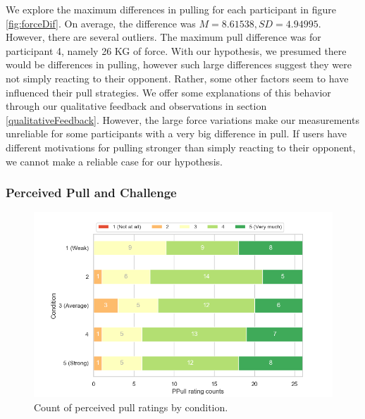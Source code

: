 We explore the maximum differences in pulling for each participant in figure \ref{fig:forceDif}. On average, the difference was $M=8.61538, SD=4.94995$. However, there are several outliers. The maximum pull difference was for participant 4, namely 26 KG of force. With our hypothesis, we presumed there would be differences in pulling, however such large differences suggest they were not simply reacting to their opponent. Rather, some other factors seem to have influenced their pull strategies. We offer some explanations of this behavior through our qualitative feedback and observations in section \ref{qualitativeFeedback}. However, the large force variations make our measurements unreliable for some participants with a very big difference in pull. If users have different motivations for pulling stronger than simply reacting to their opponent, we cannot make a reliable case for our hypothesis.

 \clearpage   

\subsubsection{Perceived Pull and Challenge}
\label{subsubsection:ppullChallenge}
  
\begin{figure}[H]
\centering
\captionsetup{justification=centering,margin=0.1cm}
\hspace{-20mm}
\includegraphics[scale=0.7]{Files/Plots/ppull_by_condition_count_stacked.png}
\caption{Count of perceived pull ratings by condition.}
\label{fig:ppullStacked}
\end{figure}
\vspace{-5mm}

